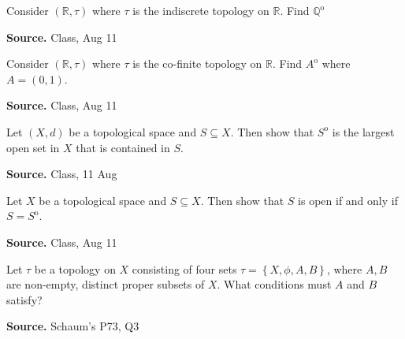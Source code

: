 \documentclass[12pt,twoside]{report}
\newenvironment*{source}{\hfill\scriptsize\textbf{Source.}\space}{\par}
\begin{document}
\begin{samepage}
\begin{ex}
Consider $\left (\mathbb{R}, \tau\right )$ where $\tau$ is the indiscrete topology on $\mathbb{R}$.
Find $\mathbb{Q} ^\mathrm{o}$
\end{ex}
\begin{source}
Class, Aug 11
\end{source}
\end{samepage}

\begin{samepage}
\begin{ex}
Consider $\left (\mathbb{R}, \tau\right )$ where $\tau$ is the co-finite topology on $\mathbb{R}$.
Find $A^\mathrm{o}$ where $A = \left (0,1\right )$.
\end{ex}
\begin{source}
Class, Aug 11
\end{source}
\end{samepage}

\begin{samepage}
\begin{ex}
Let $\left (X,d\right )$ be a topological space and $S \subseteq X$. Then show that $S ^\mathrm{o}$ is the largest open set in $X$ that is contained in $S$.
\end{ex}
\begin{source}
Class, 11 Aug
\end{source}
\end{samepage}

\begin{samepage}
\begin{ex}
Let $X$ be a topological space and $S \subseteq X$. Then show that $S$ is open if and only if $S = S ^\mathrm{o}$.
\end{ex}
\begin{source}
Class, Aug 11
\end{source}
\end{samepage}

\begin{samepage}
\begin{ex}
Let $\tau$ be a topology on $X$ consisting of four sets $ \tau = \left\{ X, \phi, A, B \right\} $, where $A, B$ are non-empty, distinct proper subsets of $X$.
What conditions must $A$ and $B$ satisfy?
\end{ex}
\begin{source}
Schaum's P73, Q3
\end{source}
\end{samepage}
\end{document}
